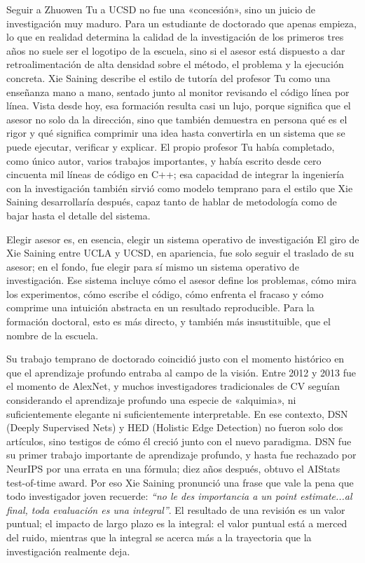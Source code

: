 \documentclass[a4paper,12pt]{article}
\begin{document}
Seguir a Zhuowen Tu a UCSD no fue una «concesión», sino un juicio de investigación muy maduro. Para un estudiante de doctorado que apenas empieza, lo que en realidad determina la calidad de la investigación de los primeros tres años no suele ser el logotipo de la escuela, sino si el asesor está dispuesto a dar retroalimentación de alta densidad sobre el método, el problema y la ejecución concreta. Xie Saining describe el estilo de tutoría del profesor Tu como una enseñanza mano a mano, sentado junto al monitor revisando el código línea por línea. Vista desde hoy, esa formación resulta casi un lujo, porque significa que el asesor no solo da la dirección, sino que también demuestra en persona qué es el rigor y qué significa comprimir una idea hasta convertirla en un sistema que se puede ejecutar, verificar y explicar. El propio profesor Tu había completado, como único autor, varios trabajos importantes, y había escrito desde cero cincuenta mil líneas de código en C++; esa capacidad de integrar la ingeniería con la investigación también sirvió como modelo temprano para el estilo que Xie Saining desarrollaría después, capaz tanto de hablar de metodología como de bajar hasta el detalle del sistema.

\begin{importantbox}{Elegir asesor es, en esencia, elegir un sistema operativo de investigación}
El giro de Xie Saining entre UCLA y UCSD, en apariencia, fue solo seguir el traslado de su asesor; en el fondo, fue elegir para sí mismo un sistema operativo de investigación. Ese sistema incluye cómo el asesor define los problemas, cómo mira los experimentos, cómo escribe el código, cómo enfrenta el fracaso y cómo comprime una intuición abstracta en un resultado reproducible. Para la formación doctoral, esto es más directo, y también más insustituible, que el nombre de la escuela.
\end{importantbox}

Su trabajo temprano de doctorado coincidió justo con el momento histórico en que el aprendizaje profundo entraba al campo de la visión. Entre 2012 y 2013 fue el momento de AlexNet, y muchos investigadores tradicionales de CV seguían considerando el aprendizaje profundo una especie de «alquimia», ni suficientemente elegante ni suficientemente interpretable. En ese contexto, DSN (Deeply Supervised Nets) y HED (Holistic Edge Detection) no fueron solo dos artículos, sino testigos de cómo él creció junto con el nuevo paradigma. DSN fue su primer trabajo importante de aprendizaje profundo, y hasta fue rechazado por NeurIPS por una errata en una fórmula; diez años después, obtuvo el AIStats test-of-time award. Por eso Xie Saining pronunció una frase que vale la pena que todo investigador joven recuerde: \textit{``no le des importancia a un point estimate...al final, toda evaluación es una integral''}. El resultado de una revisión es un valor puntual; el impacto de largo plazo es la integral: el valor puntual está a merced del ruido, mientras que la integral se acerca más a la trayectoria que la investigación realmente deja.
\end{document}
